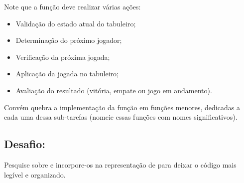 Note que a função deve realizar várias ações:
\begin{itemize}
\item Validação do estado atual do tabuleiro;
\item Determinação do próximo jogador;
\item Verificação da próxima jogada;
\item Aplicação da jogada no tabuleiro;
\item Avaliação do resultado (vitória, empate ou jogo em andamento).
\end{itemize}

Convém quebra a implementação da função  em funções menores, dedicadas a cada uma dessa
sub-tarefas (nomeie essas funções com nomes significativos).

\subsection*{Desafio:}
Pesquise sobre  e incorpore-os na representação de  para deixar o código mais legível e organizado.